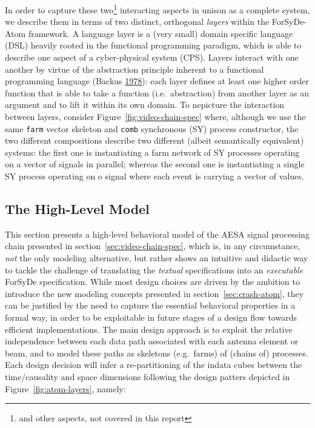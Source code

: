 \documentclass[
  a4paper,
]{article}
\begin{document}
In order to capture these two\footnote{and other aspects, not covered in
  this report} interacting aspects in unison as a complete system, we
describe them in terms of two distinct, orthogonal \emph{layers} within
the ForSyDe-Atom framework. A language layer is a (very small) domain
specific language (DSL) heavily rooted in the functional programming
paradigm, which is able to describe one aspect of a cyber-physical
system (CPS). Layers interact with one another by virtue of the
abstraction principle inherent to a functional programming language
(Backus \protect\hyperlink{ref-backus-1978}{1978}): each layer defines
at least one higher order function that is able to take a function
(i.e.~abstraction) from another layer as an argument and to lift it
within its own domain. To nepicture the interaction between layers,
consider Figure~\ref{fig:video-chain-spec} where, although we use the
same \texttt{farm} vector skeleton and \texttt{comb} synchronous (SY)
process constructor, the two different compositions describe two
different (albeit semantically equivalent) systems: the first one is
instantiating a farm network of SY processes operating on a vector of
signals in parallel; whereas the second one is instantiating a single SY
process operating on o signal where each event is carrying a vector of
values.

\hypertarget{sec:atom-network}{%
\subsection{The High-Level Model}\label{sec:atom-network}}

This section presents a high-level behavioral model of the AESA signal
processing chain presented in section~\ref{sec:video-chain-spec}, which
is, in any circumstance, \emph{not} the only modeling alternative, but
rather shows an intuitive and didactic way to tackle the challenge of
translating the \emph{textual} specifications into an \emph{executable}
ForSyDe specification. While most design choices are driven by the
ambition to introduce the new modeling concepts presented in
section~\ref{sec:crash-atom}, they can be justified by the need to
capture the essential behavioral properties in a formal way, in order to
be exploitable in future stages of a design flow towards efficient
implementations. The main design approach is to exploit the relative
independence between each data path associated with each antenna element
or beam, and to model these paths as skeletons (e.g.~farms) of (chains
of) processes. Each design decision will infer a re-partitioning of the
indata cubes between the time/causality and space dimensions following
the design patters depicted in Figure~\ref{fig:atom-layers}, namely:
\end{document}
